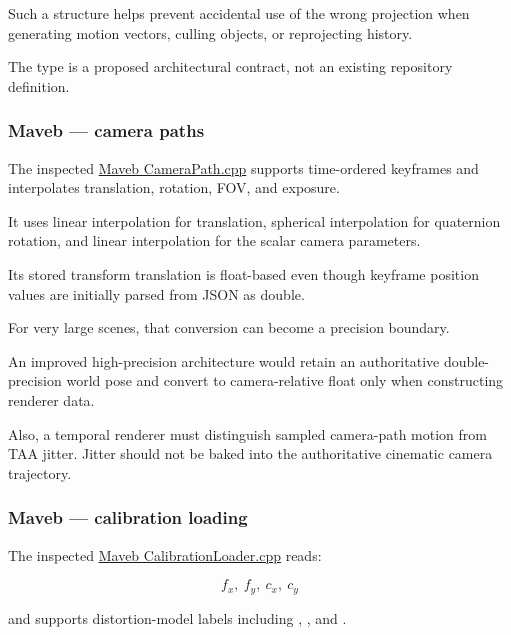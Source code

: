 Such a structure helps prevent accidental use of the wrong projection when generating motion vectors, culling objects, or reprojecting history.

The type is a proposed architectural contract, not an existing repository definition.

\subsubsection{Maveb --- camera paths}\label{02-foundations-ii-ch037-maveb-camera-paths}

\hypertarget{02-foundations-ii-ch037-maveb-camera-paths}{}

The inspected \href{https://github.com/swayam8624/Maveb/blob/main/engine/scene/src/CameraPath.cpp?utm_source=chatgpt.com}{Maveb CameraPath.cpp} supports time-ordered keyframes and interpolates translation, rotation, FOV, and exposure.

It uses linear interpolation for translation, spherical interpolation for quaternion rotation, and linear interpolation for the scalar camera parameters.

Its stored transform translation is float-based even though keyframe position values are initially parsed from JSON as double.

For very large scenes, that conversion can become a precision boundary.

An improved high-precision architecture would retain an authoritative double-precision world pose and convert to camera-relative float only when constructing renderer data.

Also, a temporal renderer must distinguish sampled camera-path motion from TAA jitter. Jitter should not be baked into the authoritative cinematic camera trajectory.

\subsubsection{Maveb --- calibration loading}\label{02-foundations-ii-ch037-maveb-calibration-loading}

\hypertarget{02-foundations-ii-ch037-maveb-calibration-loading}{}

The inspected \href{https://github.com/swayam8624/Maveb/blob/main/engine/capture/calibration/CalibrationLoader.cpp?utm_source=chatgpt.com}{Maveb CalibrationLoader.cpp} reads:

\[
 f_x,\ f_y,\ c_x,\ c_y
\]

and supports distortion-model labels including , , and .

